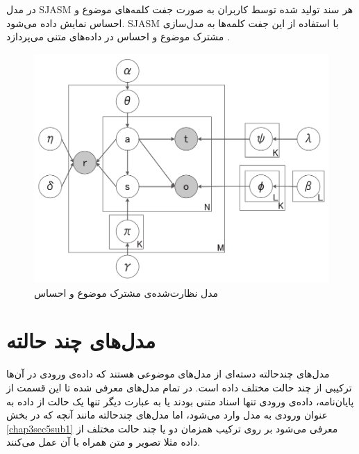 در مدل 
SJASM
هر سند تولید شده توسط کاربران به صورت جفت کلمه‌های موضوع و احساس نمایش داده می‌شود. SJASM با استفاده از این جفت کلمه‌ها به مدل‌سازی مشترک موضوع و احساس در داده‌های متنی می‌پردازد
\cite{7855825}.
‌
	\begin{figure}[!t]
		\centering
		\includegraphics[scale=0.25]{chap3-img/SJASM}
		\caption{مدل نظارت‌شده‌ی مشترک موضوع و احساس \cite{7855825}}
		\label{chap3-fig13}
	\end{figure}


	
\section{مدل‌های چند حالته}
	مدل‌های چندحالته 
	دسته‌ای از مدل‌های موضوعی هستند که داده‌ی ورودی در آن‌ها ترکیبی‌ از چند حالت مختلف داده است. در تمام مدل‌های معرفی‌ شده تا این قسمت از پایان‌‌نامه، داده‌ی ورودی تنها اسناد متنی بودند یا به عبارت دیگر تنها یک حالت از داده به عنوان ورودی به مدل وارد می‌‌شود، اما مدل‌های چندحالته مانند آنچه که در بخش
	\ref{chap3sec5sub1}
	معرفی‌ می‌‌شود بر روی ترکیب همزمان دو یا چند حالت مختلف از داده مثلا تصویر و متن همراه با آن عمل می‌‌کنند.

	
	
